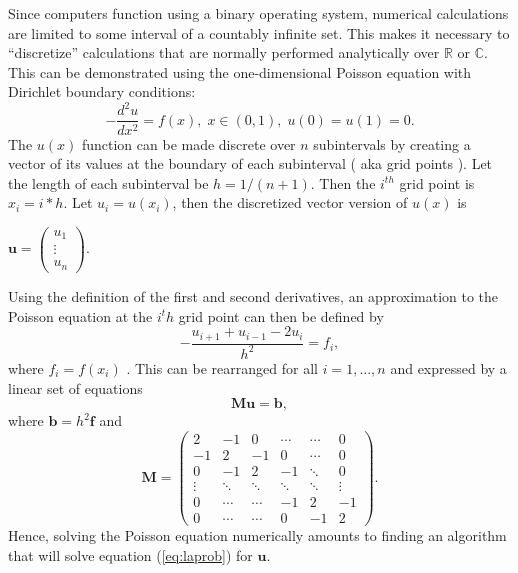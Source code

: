 \documentclass[a4paper,12pt]{report}
\begin{document}
Since computers function using a binary operating system, numerical calculations are limited to some interval of a countably infinite set. This makes it necessary to ``discretize'' calculations that are normally performed analytically over $\mathbb{R}$ or $\mathbb{C}$. This can be demonstrated using the one-dimensional Poisson equation with Dirichlet boundary conditions:
\begin{equation}
\label{eq:poisson1}
 -\dfrac{d^2u}{dx^2} = f(x), \; x\in(0,1), \; u(0) = u(1) = 0.
\end{equation}
The $u(x)$ function can be made discrete over $n$ subintervals by creating a vector of its values at the boundary of each subinterval ( aka grid points ). Let the length of each subinterval be $h = 1/(n+1)$. Then the $i^{th}$ grid point is $x_i = i*h$. Let $u_i = u(x_i)$, then the discretized vector version of $u(x)$ is
\begin{center}
 $\boldsymbol{u} =
\begin{pmatrix}
  u_1\\
  \vdots\\
  u_{n}
\end{pmatrix}.$
\end{center}
Using the definition of the first and second derivatives, an approximation to the Poisson equation at the $i^th$ grid point can then be defined by
\begin{equation}
\label{eq:poissond}
 -\frac{u_{i+1} + u_{i-1} - 2u_i}{h^2} = f_i,
\end{equation}
where $f_i = f(x_i)$ \cite[ch.~7]{Landau:2008}. This can be rearranged for all $i = 1,...,n$ and expressed by a linear set of equations
\begin{equation}
 \label{eq:laprob}
  \boldsymbol{M}\boldsymbol{u} = \boldsymbol{b},
\end{equation}
where $\boldsymbol{b} = h^2\boldsymbol{f}$ and 
\begin{equation}
\label{eq:tridiag}
\boldsymbol{M}=
 \begin{pmatrix}
    2      & -1 &  0 & \cdots & \cdots  & 0  \\
   -1      &  2 & -1 &   0    & \cdots  & 0  \\	
    0      & -1 &  2 &   -1   & \ddots  & 0  \\
    \vdots &  \ddots &  \ddots &   \ddots   & \ddots  & \vdots  \\
    0      & \cdots &  \cdots &  -1   & 2  & -1 \\
    0      & \cdots &  \cdots &  0   & -1  & 2 
 \end{pmatrix}.
\end{equation}
Hence, solving the Poisson equation numerically amounts to finding an algorithm that will solve equation (\ref{eq:laprob}) for $\boldsymbol{u}$.
\end{document}
